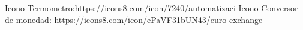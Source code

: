 Icono Termometro:https://icons8.com/icon/7240/automatizaci%
Icono Conversor de monedad: https://icons8.com/icon/ePaVF31bUN43/euro-exchange
